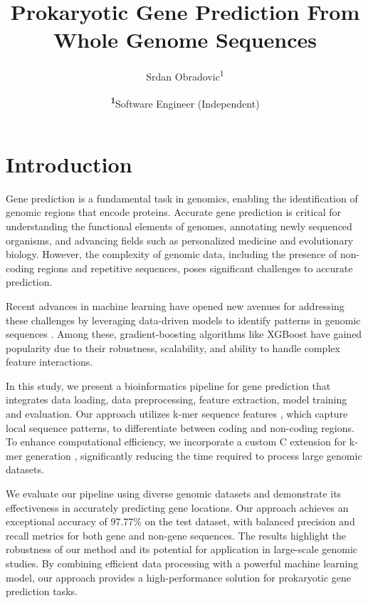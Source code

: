 \documentclass[
	a4paper, %
	10pt, %
	unnumberedsections, %
	twoside, %
]{LTJournalArticle}
\title{Prokaryotic Gene Prediction From \\ Whole Genome Sequences}
\author{%
	Srdan Obradovic\textsuperscript{1}
}
\date{\footnotesize\textsuperscript{\textbf{1}}Software Engineer (Independent)}
\begin{document}
\maketitle %


\section{Introduction}

Gene prediction is a fundamental task in genomics, enabling the identification of genomic regions that encode proteins. Accurate gene prediction is critical for understanding the functional elements of genomes, annotating newly sequenced organisms, and advancing fields such as personalized medicine and evolutionary biology. However, the complexity of genomic data, including the presence of non-coding regions and repetitive sequences, poses significant challenges to accurate prediction.

Recent advances in machine learning have opened new avenues for addressing these challenges by leveraging data-driven models to identify patterns in genomic sequences \cite{Zou:2019, Alipanahi:2015}. Among these, gradient-boosting algorithms like XGBoost \cite{Chen:2016} have gained popularity due to their robustness, scalability, and ability to handle complex feature interactions.

In this study, we present a bioinformatics pipeline for gene prediction that integrates data loading, data preprocessing, feature extraction, model training and evaluation. Our approach utilizes k-mer sequence features \cite{Marçais:2011}, which capture local sequence patterns, to differentiate between coding and non-coding regions. To enhance computational efficiency, we incorporate a custom C extension for k-mer generation \cite{Behnel:2011}, significantly reducing the time required to process large genomic datasets.

We evaluate our pipeline using diverse genomic datasets and demonstrate its effectiveness in accurately predicting gene locations. Our approach achieves an exceptional accuracy of 97.77\% on the test dataset, with balanced precision and recall metrics for both gene and non-gene sequences. The results highlight the robustness of our method and its potential for application in large-scale genomic studies. By combining efficient data processing with a powerful machine learning model, our approach provides a high-performance solution for prokaryotic gene prediction tasks.
\end{document}
